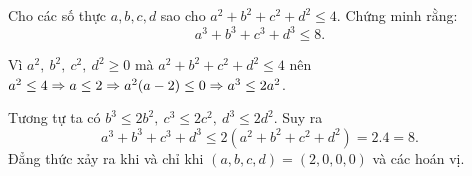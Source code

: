 \begin{problem}
	Cho các số thực $a, b, c, d$ sao cho $a^2 + b^2 + c^2 + d^2 \le 4$. Chứng minh rằng:
	$$
		a^3 + b^3 + c^3 + d^3 \le 8.
	$$
	\solution
	
	Vì $a^2,\ b^2,\ c^2,\ d^2 \ge 0$ mà $a^2 + b^2 + c^2 + d^2 \le 4$ nên $a^2 \le 4 
	\Rightarrow a \le 2 \\ \Rightarrow a^2(a - 2) \le 0 \Rightarrow a^3 \le 2a^2$.

	Tương tự ta có $b^3 \le 2b^2,\ c^3 \le 2c^2,\ d^3 \le 2d^2$. Suy ra 
	$$
		a^3 + b^3 + c^3 + d^3 \le 2(a^2 + b^2 + c^2 + d^2) = 2.4 = 8.
	$$
	Đẳng thức xảy ra khi và chỉ khi $(a, b, c, d) = (2, 0, 0, 0)$ và các hoán vị.
\end{problem}